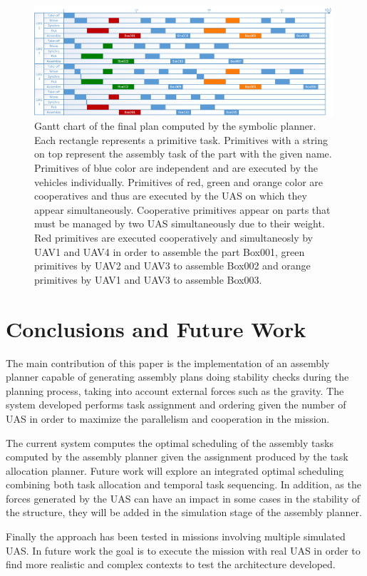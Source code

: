\documentclass[letterpaper, 12pt, conference]{ieeeconf}    %
\begin{document}
\begin{figure}
    \centering
    \includegraphics[width=0.99\textwidth]{gantt.png}
    \caption[Gantt chart of the final plans computed by the task planner.]{Gantt chart of the final plan computed by the symbolic planner. Each rectangle represents a primitive task. Primitives with a string on top represent the assembly task of the part with the given name. Primitives of blue color are independent and are executed by the vehicles individually. Primitives of red, green and orange color are cooperatives and thus are executed by the UAS on which they appear simultaneously. Cooperative primitives appear on parts that must be managed by two UAS simultaneously due to their weight. Red primitives are executed cooperatively and simultaneosly by UAV1 and UAV4 in order to assemble the part Box001, green primitives by UAV2 and UAV3 to assemble Box002 and orange primitives by UAV1 and UAV3 to assemble Box003.}
    \label{fig:gantt}
\end{figure}

\section{Conclusions and Future Work}
	\label{sec:conclusions}

The main contribution of this paper is the implementation of an assembly planner capable of generating assembly plans doing stability checks during the planning process, taking into account external forces such as the gravity. The system developed performs task assignment and ordering given the number of UAS in order to maximize the parallelism and cooperation in the mission. 

The current system computes the optimal scheduling of the assembly tasks computed by the assembly planner given the assignment produced by the task allocation planner. Future work will explore an integrated optimal scheduling combining both task allocation and temporal task sequencing. In addition, as the forces generated by the UAS can have an impact in some cases in the stability of the structure, they will be added in the simulation stage of the assembly planner.

Finally the approach has been tested in missions involving multiple simulated UAS. In future work the goal is to execute the mission with real UAS in order to find more realistic and complex contexts to test the architecture developed.



\end{document}
